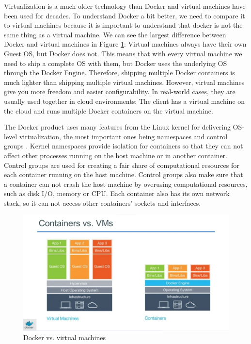 \documentclass[fleqn,12pt]{olplainarticle}
\begin{document}
Virtualization is a much older technology than Docker and virtual machines have been used for decades. To understand Docker a bit better, we need to compare
it to virtual machines because it is important to understand that docker is not the same thing as a virtual machine. We can see the largest difference between Docker and virtual machines in Figure \ref{fig:dockervsvm}: Virtual machines always have their own Guest OS, but Docker does not. This means that with every virtual machine we need to ship a complete OS with them, but Docker uses the underlying OS through the Docker Engine. Therefore, shipping multiple Docker containers is much lighter than shipping multiple virtual machines. However, virtual machines give you more freedom and easier configurability. In real-world cases, they are usually used together in cloud environments: The client has a virtual machine on the cloud and runs multiple Docker containers on the virtual machine.

The Docker product uses many features from the Linux kernel for delivering OS-level virtualization, the most important ones being namespaces and control groups \citep{docker:security}. Kernel namespaces provide isolation for containers so that they can not affect other processes running on the host machine or in another container. Control groups are used for creating a fair share of computational resources for each container running on the host machine. Control groups also make sure that a container can not crash the host machine by overusing computational resources, such as disk I/O, memory or CPU. Each container also has its own network stack, so it can not access other containers' sockets and interfaces.

\begin{figure}[h]
    \centering
    \includegraphics[width=1\textwidth]{docker_vs_vm.png}
    \caption{Docker vs. virtual machines \cite{docker:vs_vm}}
    \label{fig:dockervsvm}
\end{figure}
\end{document}
